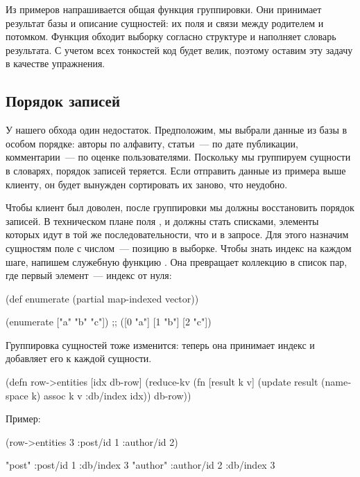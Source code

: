 Из примеров напрашивается общая функция группировки. Они принимает результат базы и описание сущностей: их поля и связи между родителем и потомком. Функция обходит выборку согласно структуре и наполняет словарь результата. С учетом всех тонкостей код будет велик, поэтому оставим эту задачу в качестве упражнения.

\subsection{Порядок записей}

У нашего обхода один недостаток. Предположим, мы выбрали данные из базы в особом порядке: авторы по алфавиту, статьи~--- по дате публикации, комментарии~--- по оценке пользователями. Поскольку мы группируем сущности в словарях, порядок записей теряется. Если отправить данные из примера выше клиенту, он будет вынужден сортировать их заново, что неудобно.

Чтобы клиент был доволен, после группировки мы должны восстановить порядок записей. В техническом плане поля ,  и  должны стать списками, элементы которых идут в той же последовательности, что и в запросе. Для этого назначим сущностям поле  с числом~--- позицию в выборке. Чтобы знать индекс на каждом шаге, напишем служебную функцию . Она превращает коллекцию в список пар, где первый элемент~--- индекс от нуля:

\begin{english}
  \begin{clojure}
(def enumerate
  (partial map-indexed vector))

(enumerate ["a" "b" "c"])
;; ([0 "a"] [1 "b"] [2 "c"])
  \end{clojure}
\end{english}

Группировка сущностей тоже изменится: теперь она принимает индекс и добавляет его к каждой сущности.

\begin{english}
  \begin{clojure}
(defn row->entities [idx db-row]
  (reduce-kv
   (fn [result k v]
     (update result
             (namespace k)
             assoc
             k v
             :db/index idx))
   {}
   db-row))
  \end{clojure}
\end{english}

Пример:

\begin{english}
  \begin{clojure}
(row->entities 3 {:post/id 1 :author/id 2})

{"post" {:post/id 1 :db/index 3}
 "author" {:author/id 2 :db/index 3}}
  \end{clojure}
\end{english}

